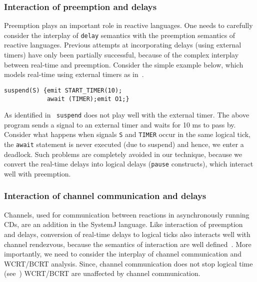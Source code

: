 \subsubsection{Interaction of preemption and delays}
\label{sec:inter-preempt-delays}

Preemption plays an important role in reactive languages. One needs to
carefully consider the interplay of \texttt{delay} semantics with the
preemption semantics of reactive languages. Previous attempts at
incorporating delays (using external timers) have only been partially
successful, because of the complex interplay between real-time and
preemption. Consider the simple example below, which models real-time
using external timers as in~\cite{rsh94}.

\begin{verbatim}
suspend(S) {emit START_TIMER(10); 
            await (TIMER);emit O1;}
\end{verbatim}

As identified in~\cite{Bourke2009a} \texttt{suspend} does not play well
with the external timer. The above program sends a signal to an external
timer and waits for 10 ms to pass by. Consider what happens when signals
\texttt{S} and \texttt{TIMER} occur in the same logical tick, the
\texttt{await} statement is never executed (due to suspend) and hence,
we enter a deadlock. Such problems are completely avoided in our
technique, because we convert the real-time delays into logical delays
(\texttt{pause} constructs), which interact well with preemption.

\subsubsection{Interaction of channel communication and delays}
\label{sec:inter-chann-comm}

Channels, used for communication between reactions in asynchronously
running CDs, are an addition in the SystemJ language. Like interaction
of preemption and delays, conversion of real-time delays to logical
ticks also interacts well with channel rendezvous, because the semantics
of interaction are well defined~\cite{amal10}. More importantly, we need
to consider the interplay of channel communication and WCRT/BCRT
analysis. Since, channel communication does not stop logical time
(see~\cite{amal10}) WCRT/BCRT are unaffected by channel
communication. %


